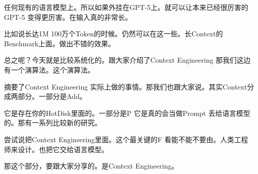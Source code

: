 \documentclass[12pt,a4paper]{article}
\begin{document}
任何现有的语言模型上。所以如果外挂在GPT-5上。就可以让本来已经很厉害的GPT-5 变得更厉害。在输入真的非常长。

比如说长达1M 100万个Token的时候。仍然可以在这一些。长Context的Benchmark上面。做出不错的效果。

总之呢？今天就是比较系统化的。跟大家介绍了Context Engineering 那我们这边有一个演算法。这个演算法。

摘要了Context Engineering 实际上做的事情。那我们也跟大家说。其实Context分成两部分。一部分是Add。

它是存在你的HotDisk里面的。一部分是P 它是真的会当做Prompt 丢给语言模型的。那有一系列比较新的研究。

尝试说把Context Engineering里面。这个最关键的F 看能不能不要由。人类工程师来设计。也把它交给语言模型。

那这个部分，要跟大家分享的。是Context Engineering。
\end{document}
